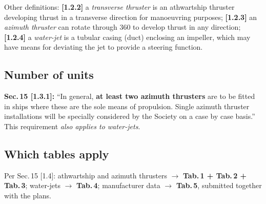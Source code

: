 \documentclass[11pt,a4paper]{report}
\begin{document}
\vspace{2mm}
\noindent{}

\vspace{2mm}
\noindent Other definitions: \textbf{[1.2.2]} a \emph{transverse thruster} is an
athwartship thruster developing thrust in a transverse direction for manoeuvring
purposes; \textbf{[1.2.3]} an \emph{azimuth thruster} can rotate through
360\textdegree{} to develop thrust in any direction; \textbf{[1.2.4]} a
\emph{water-jet} is a tubular casing (duct) enclosing an impeller, which may have
means for deviating the jet to provide a steering function.

\subsection{Number of units}
\textbf{Sec.\,15 [1.3.1]:} ``In general, \textbf{at least two azimuth thrusters}
are to be fitted in ships where these are the sole means of propulsion. Single
azimuth thruster installations will be specially considered by the Society on a
case by case basis.'' This requirement \emph{also applies to water-jets}.

\subsection{Which tables apply}
Per Sec.\,15 [1.4]: athwartship and azimuth thrusters $\rightarrow$
\textbf{Tab.\,1 + Tab.\,2 + Tab.\,3}; water-jets $\rightarrow$ \textbf{Tab.\,4};
manufacturer data $\rightarrow$ \textbf{Tab.\,5}, submitted together with the plans.
\end{document}
